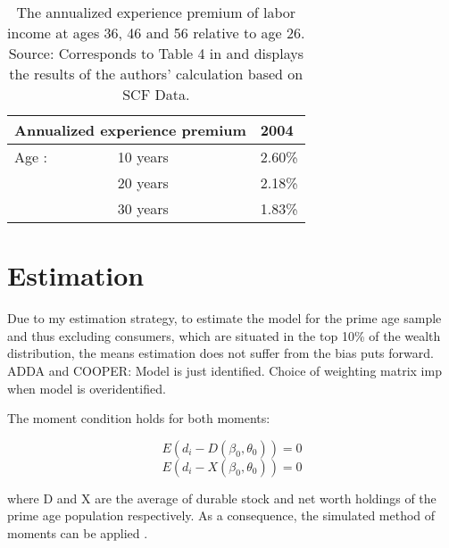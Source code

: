 \documentclass[a4paper,12pt,legno]{article}
\begin{document}
\begin{table}[!htbp]
\centering
\begin{threeparttable}
\setlength{\tabcolsep}{6em}
\caption[The annualized experience premium of labor income at ages 36, 46 and 56 relative to age 26.Source: Corresponds to Table 4 in \cite{hintermaier2011} and is based on the authors' calculation based on SCF Data.]{The annualized experience premium of labor income at ages 36, 46 and 56 relative to age 26.\\\hspace{\textwidth} Source: Corresponds to Table 4 in \cite{hintermaier2011} and displays the results of the authors' calculation based on SCF Data.}
\label{my-label}
\begin{tabular}{@{}lll@{}}
\toprule
\multicolumn{2}{l}{Annualized experience premium}   & 2004   \\ \midrule
Age \textendash  26:& 10 years                & 2.60\% \\
                         & 20 years               & 2.18\% \\
                         & 30 years                & 1.83\% \\ \bottomrule
\end{tabular}
\end{threeparttable}
\end{table}

\section{Estimation}
\label{estimation_procedure}

Due to my estimation strategy, to estimate the model for the prime age sample and thus excluding consumers, which are situated in the top 10\% of the wealth distribution, the means estimation does not suffer from the bias \cite{cagetti2003} puts forward. \\  

ADDA and COOPER: 
Model is just identified. Choice of weighting matrix imp when model is overidentified. 

The moment condition holds for both moments: 

\[ E(d_{i} -  D(\beta_{0},\theta_{0})) = 0 \]
\[ E(d_{i} -  X(\beta_{0},\theta_{0})) = 0 \]

where D and X are the average of durable stock and net worth holdings of the prime age population respectively. As a consequence, the simulated method of moments can be applied \citep{duffie1993}.\\
\end{document}
